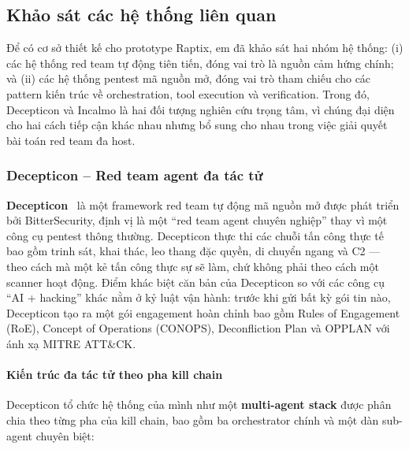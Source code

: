 
\subsection{Khảo sát các hệ thống liên quan}
\label{sec:khao-sat-he-thong}

Để có cơ sở thiết kế cho prototype Raptix, em đã khảo sát hai nhóm hệ thống: (i) các hệ thống red team tự động tiên tiến, đóng vai trò là nguồn cảm hứng chính; và (ii) các hệ thống pentest mã nguồn mở, đóng vai trò tham chiếu cho các pattern kiến trúc về orchestration, tool execution và verification. Trong đó, Decepticon và Incalmo là hai đối tượng nghiên cứu trọng tâm, vì chúng đại diện cho hai cách tiếp cận khác nhau nhưng bổ sung cho nhau trong việc giải quyết bài toán red team đa host.

\subsubsection{Decepticon -- Red team agent đa tác tử}

\textbf{Decepticon}~\cite{decepticon} là một framework red team tự động mã nguồn mở được phát triển bởi BitterSecurity, định vị là một ``red team agent chuyên nghiệp'' thay vì một công cụ pentest thông thường. Decepticon thực thi các chuỗi tấn công thực tế bao gồm trinh sát, khai thác, leo thang đặc quyền, di chuyển ngang và C2 — theo cách mà một kẻ tấn công thực sự sẽ làm, chứ không phải theo cách một scanner hoạt động. Điểm khác biệt căn bản của Decepticon so với các công cụ ``AI + hacking'' khác nằm ở kỷ luật vận hành: trước khi gửi bất kỳ gói tin nào, Decepticon tạo ra một gói engagement hoàn chỉnh bao gồm Rules of Engagement (RoE), Concept of Operations (CONOPS), Deconfliction Plan và OPPLAN với ánh xạ MITRE ATT\&CK.

\paragraph{Kiến trúc đa tác tử theo pha kill chain}

Decepticon tổ chức hệ thống của mình như một \textbf{multi-agent stack} được phân chia theo từng pha của kill chain, bao gồm ba orchestrator chính và một dàn sub-agent chuyên biệt:


